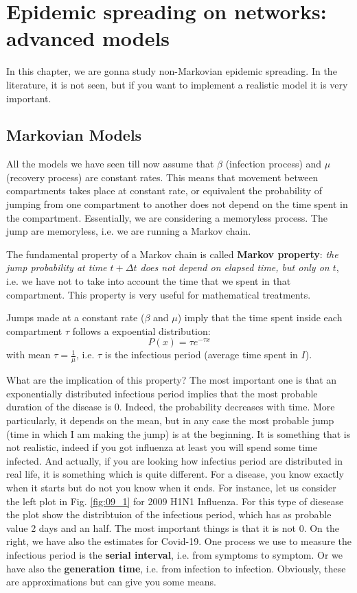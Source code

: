 \documentclass[../main/main.tex]{subfiles}
\begin{document}
\chapter{Epidemic spreading on networks: advanced models}

In this chapter, we are gonna study non-Markovian epidemic spreading. In the literature, it is not seen, but if you want to implement a realistic model it is very important.

\section{Markovian Models}

All the models we have seen till now assume that \( \beta  \) (infection process) and \( \mu  \) (recovery process) are constant rates.
This means that movement between compartments takes place at constant rate, or equivalent the probability of jumping from one compartment to another does not depend on the time spent in the compartment. Essentially, we are considering a memoryless process.
The jump are memoryless, i.e. we are running a Markov chain.

The fundamental property of a Markov chain is called \textbf{Markov property}: \emph{the jump probability at time \( t + \Delta t \) does not depend on elapsed time, but only on \( t \)}, i.e. we have not to take into account the time that we spent in that compartment.
This property is very useful for mathematical treatments.

Jumps made at a constant rate (\( \beta  \) and \( \mu  \)) imply that the time spent inside each compartment \( \tau  \) follows a expoential distribution:
\begin{equation}
  P(x) = \tau e^{- \tau x}
\end{equation}
with mean \( \tau = \frac{1}{\mu }\), i.e. \( \tau  \) is the infectious period (average time spent in \( I \)).

What are the implication of this property? The most important one is that an exponentially distributed infectious period implies that the most probable duration of the disease is 0. Indeed, the probability decreases with time.
More particularly, it depends on the mean, but in any case the most probable jump (time in which I am making the jump) is at the beginning.
It is something that is not realistic, indeed if you got influenza at least you will spend some time infected.
And actually, if you are looking how infectius period are distributed in real life, it is something which is quite different. For a disease, you know exactly when it starts but do not you know when it ends.
For instance, let us consider the left plot in Fig. \ref{fig:09_1} for 2009 H1N1 Influenza. For this type of diesease the plot show the distribtuion of the infectious period, which has as probable value 2 days and an half. The most important things is that it is not 0. On the right, we have also the estimates for Covid-19. One process we use to measure the infectious period is the \textbf{serial interval}, i.e. from symptoms to symptom. Or we have also the \textbf{generation time}, i.e. from infection to infection. Obviously, these are approximations but can give you some means.
\end{document}

